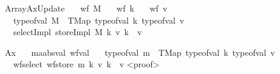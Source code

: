 \documentclass[11pt]{article}
\begin{document}
\begin{isabellebody}
\isamarkupfalse%
\ ArrayAxUpdate{\isacharcolon}{\kern0pt}\isanewline
\ \ \ {\isachardoublequoteopen}wf\ M{\isachardoublequoteclose}\isanewline
\ \ \ {\isachardoublequoteopen}wf\ k{\isachardoublequoteclose}\isanewline
\ \ \ {\isachardoublequoteopen}wf\ v{\isachardoublequoteclose}\isanewline
\ \ \ {\isachardoublequoteopen}type{\isacharunderscore}{\kern0pt}of{\isacharunderscore}{\kern0pt}val\ M\ {\isacharequal}{\kern0pt}\ TMap\ {\isacharparenleft}{\kern0pt}type{\isacharunderscore}{\kern0pt}of{\isacharunderscore}{\kern0pt}val\ k{\isacharparenright}{\kern0pt}\ {\isacharparenleft}{\kern0pt}type{\isacharunderscore}{\kern0pt}of{\isacharunderscore}{\kern0pt}val\ v{\isacharparenright}{\kern0pt}{\isachardoublequoteclose}\isanewline
\ \ \ {\isachardoublequoteopen}selectImpl\ {\isacharparenleft}{\kern0pt}storeImpl\ M\ k\ v{\isacharparenright}{\kern0pt}\ k\ {\isacharequal}{\kern0pt}\ v{\isachardoublequoteclose}\isanewline

\isamarkupfalse%
\ Ax{}{\isacharcolon}{\kern0pt}\isanewline
\ \ \ m{\isacharcolon}{\kern0pt}{\isacharcolon}{\kern0pt}{\isachardoublequoteopen}{\isacharprime}{\kern0pt}a{\isacharcolon}{\kern0pt}{\isacharcolon}{\kern0pt}absval\ wf{\isacharunderscore}{\kern0pt}val{\isachardoublequoteclose}\isanewline
\ \ \ {\isachardoublequoteopen}type{\isacharunderscore}{\kern0pt}of{\isacharunderscore}{\kern0pt}val\ m\ {\isacharequal}{\kern0pt}\ TMap\ {\isacharparenleft}{\kern0pt}type{\isacharunderscore}{\kern0pt}of{\isacharunderscore}{\kern0pt}val\ k{\isacharparenright}{\kern0pt}\ {\isacharparenleft}{\kern0pt}type{\isacharunderscore}{\kern0pt}of{\isacharunderscore}{\kern0pt}val\ v{\isacharparenright}{\kern0pt}{\isachardoublequoteclose}\isanewline
\ \ \ {\isachardoublequoteopen}wf{\isacharunderscore}{\kern0pt}select\ {\isacharparenleft}{\kern0pt}wf{\isacharunderscore}{\kern0pt}store\ m\ k\ v{\isacharparenright}{\kern0pt}\ k\ {\isacharequal}{\kern0pt}\ v{\isachardoublequoteclose}\isanewline
<proof>\isanewline
\end{isabellebody}
\end{document}
